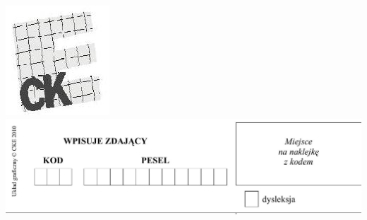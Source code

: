 \documentclass[10pt]{article}
\begin{document}
\includegraphics[max width=\textwidth, center]{2024_11_21_6a8be49478f78d0689cfg-01(1)}\\
\includegraphics[max width=\textwidth, center]{2024_11_21_6a8be49478f78d0689cfg-01(2)}
\end{document}
